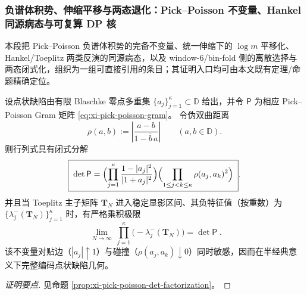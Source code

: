 \subsubsection{负谱体积势、伸缩平移与两态退化：Pick--Poisson 不变量、Hankel 同源病态与可复算 DP 核}
本段把 Pick--Poisson 负谱体积势的完备不变量、统一伸缩下的 \(\log m\) 平移化、Hankel/Toeplitz 两类反演的同源病态，以及 window-\(6\)/bin-fold 侧的离散选择与两态闭式化，组织为一组可直接引用的条目；其证明入口均可由本文既有定理/命题精确定位。

\begin{conclusion}\label{con:xi-terminal-negative-spectrum-det-invariant}
设点状缺陷由有限 Blaschke 零点多重集 \(\{a_j\}_{j=1}^{\kappa}\subset\mathbb{D}\) 给出，并令 \(\mathsf P\) 为相应 Pick--Poisson Gram 矩阵 \eqref{eq:xi-pick-poisson-gram}。
令伪双曲距离
\[
\rho(a,b):=\left|\frac{a-b}{1-\overline b\,a}\right|\qquad(a,b\in\mathbb{D}).
\]
则行列式具有闭式分解
\[
\boxed{\;
\det\mathsf P
=
\Bigl(\prod_{j=1}^{\kappa}\frac{1-|a_j|^2}{|1+a_j|^2}\Bigr)
\Bigl(\prod_{1\le j<k\le\kappa}\rho(a_j,a_k)^2\Bigr)\; }.
\]
并且当 Toeplitz 主子矩阵 \(\mathbf{T}_N\) 进入稳定显影区间、其负特征值（按重数）为 \(\{\lambda_j^{-}(\mathbf{T}_N)\}_{j=1}^{\kappa}\) 时，有严格乘积极限
\[
\boxed{\;
\lim_{N\to\infty}\ \prod_{j=1}^{\kappa}\bigl(-\lambda_j^{-}(\mathbf{T}_N)\bigr)=\det\mathsf P\; }.
\]
该不变量对贴边（\(|a_j|\uparrow 1\)）与碰撞（\(\rho(a_j,a_k)\downarrow 0\)）同时敏感，因而在半经典意义下完整编码点状缺陷几何。
\end{conclusion}
\begin{proof}[证明要点]
见命题 \ref{prop:xi-pick-poisson-det-factorization}。
\end{proof}

